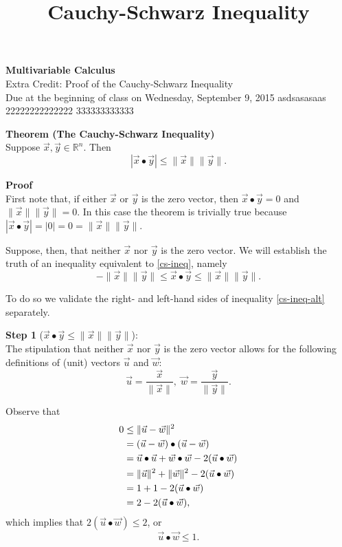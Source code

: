 \documentclass[11pt]{article}
\begin{document}
\title{Cauchy-Schwarz Inequality}

\thispagestyle{empty}

\begin{center}
{\LARGE \bf Multivariable Calculus}\\
{\large Extra Credit: Proof of the Cauchy-Schwarz Inequality}\\
Due at the beginning of class on Wednesday, September 9, 2015
asdsasasaas
22222222222222
333333333333
\end{center}

\textbf{Theorem (The Cauchy-Schwarz Inequality)}\\
Suppose $\vec{x},\vec{y} \in \mathbb{R}^n$. Then 
\begin{equation}
|\vec{x} \bullet \vec{y}| \le \|\vec{x}\| \|\vec{y}\| \label{cs-ineq}.
\end{equation}

\textbf{Proof}\\
First note that, if either $\vec{x}$ or $\vec{y}$ is the zero vector, 
then $\vec{x} \bullet \vec{y} = 0$ and $\|\vec{x}\| \|\vec{y}\| = 0$. 
In this case the theorem is trivially true because 
$|\vec{x} \bullet \vec{y}| = |0| = 0 = \|\vec{x}\| \|\vec{y}\|$.

Suppose, then, that neither $\vec{x}$ nor $\vec{y}$ is the zero vector. 
We will establish the truth of an inequality equivalent to \eqref{cs-ineq}, 
namely
\begin{equation}
-\|\vec{x}\| \|\vec{y}\| \le \vec{x} \bullet \vec{y} \le 
\|\vec{x}\| \|\vec{y}\|. \label{cs-ineq-alt}
\end{equation}
  
To do so we validate the right- and left-hand sides of inequality 
\eqref{cs-ineq-alt} separately.

\textbf{Step 1} ($\vec{x} \bullet \vec{y} \le \|\vec{x}\| \|\vec{y}\|$):\\
The stipulation that neither $\vec{x}$ nor $\vec{y}$ is the zero vector 
allows for the following definitions of (unit) vectors $\vec{u}$ and $\vec{w}$:
\begin{equation}
\vec{u} = \frac{\vec{x}}{\|\vec{x}\|}, \; \vec{w} = 
\frac{\vec{y}}{\|\vec{y}\|}. \label{def1}
\end{equation}

Observe that
\begin{align}
0 & \le \|\vec{u}-\vec{w}\|^2 \notag\\
  & =(\vec{u}-\vec{w}) \bullet (\vec{u}-\vec{w}) \notag\\
  & = \vec{u} \bullet \vec{u} + \vec{w} \bullet \vec{w} - 2(\vec{u}\bullet\vec{w}) \notag\\
  & = \|\vec{u}\|^2 + \|\vec{w}\|^2 - 2(\vec{u} \bullet \vec{w}) \notag\\
  & = 1 + 1 - 2(\vec{u} \bullet \vec{w}) \notag\\
  & = 2 - 2(\vec{u} \bullet \vec{w}) \label{eq1},
\end{align}
which implies that $2(\vec{u} \bullet \vec{w}) \le 2$, or
\begin{equation}
  \vec{u} \bullet \vec{w} \le 1. \label{final}
\end{equation}
\end{document}
